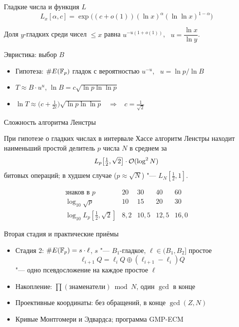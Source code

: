 \documentclass{ca-slides}
\begin{document}
\begin{canvasframe}{Гладкие числа и функция $L$}
  \[L_x[\alpha, c] = \exp\bigl((c + o(1))(\ln x)^{\alpha}(\ln\ln x)^{1-\alpha}\bigr)\]
  \begin{theorem}
    Доля $y$-гладких среди чисел $\le x$ равна $u^{-u(1 + o(1))}$, \ $u = \dfrac{\ln x}{\ln y}$.
  \end{theorem}
  \penspace[0.1\textheight]
\end{canvasframe}

\begin{canvasframe}{Эвристика: выбор $B$}
  \begin{itemize}
    \item Гипотеза: $\#E(\mathbb{F}_p)$ гладок с вероятностью $u^{-u}$, \ $u = \ln p/\ln B$
    \item $T \approx B \cdot u^u$, \quad $\ln B = c\sqrt{\ln p \ln\ln p}$
    \item $\ln T \approx \bigl(c + \frac{1}{2c}\bigr)\sqrt{\ln p \ln\ln p}$ \ $\Rightarrow$
      \ $c = \frac{1}{\sqrt 2}$
  \end{itemize}
  \penspace[0.35\textheight]
\end{canvasframe}

\begin{canvasframe}[shrink=8]{Сложность алгоритма Ленстры}
  \begin{theorem}
    При гипотезе о гладких числах в интервале Хассе алгоритм Ленстры находит наименьший
    простой делитель $p$ числа $N$ в среднем за
    \[L_p\bigl[\tfrac12, \sqrt 2\bigr] \cdot \mathcal{O}(\log^2 N)\]
    битовых операций; в худшем случае ($p \approx \sqrt N$) "--- $L_N[\frac12, 1]$.
  \end{theorem}
  \[
  \begin{array}{r|cccc}
    \text{знаков в } p & 20 & 30 & 40 & 60 \\ \hline
    \log_{10} \sqrt p & 10 & 15 & 20 & 30 \\
    \log_{10} L_p[\frac12, \sqrt 2] & 8{,}2 & 10{,}5 & 12{,}5 & 16{,}0
  \end{array}
  \]
\end{canvasframe}

\begin{canvasframe}{Вторая стадия и практические приёмы}
  \begin{itemize}
    \item Стадия 2: $\#E(\mathbb{F}_p) = s \cdot \ell$, $s$ "--- $B_1$-гладкое, $\ell \in (B_1, B_2]$ простое
      \[\ell_{i+1} Q = \ell_i Q \oplus (\ell_{i+1} - \ell_i) Q\]
      "--- одно псевдосложение на каждое простое $\ell$
    \item Накопление: $\prod (\text{знаменатели}) \bmod N$, один $\gcd$ в конце
    \item Проективные координаты: без обращений, в конце $\gcd(Z, N)$
    \item Кривые Монтгомери и Эдвардса; программа GMP-ECM
  \end{itemize}
\end{canvasframe}
\end{document}
